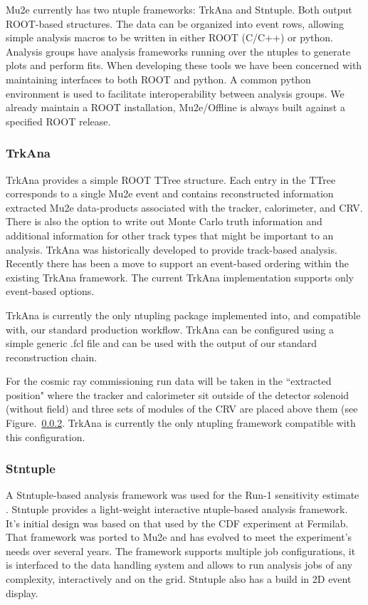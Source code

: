 
Mu2e currently has two ntuple frameworks: TrkAna and Stntuple. Both output ROOT-based structures. The data can be organized into event rows, allowing simple analysis macros to be written in either ROOT (C/C++) or python. Analysis groups have analysis frameworks running over the ntuples to generate plots and perform fits. When developing these tools we have been concerned with maintaining interfaces to both ROOT and python. A common python environment is used to facilitate interoperability between analysis groups. We already maintain a ROOT installation, Mu2e/Offline is always built against a specified ROOT release.



\subsubsection{TrkAna}

TrkAna provides a simple ROOT TTree structure. Each entry in the TTree corresponds to a single Mu2e event and contains reconstructed information extracted Mu2e data-products associated with the tracker, calorimeter, and CRV. There is also the option to write out Monte Carlo truth information and additional information for other track types that might be important to an analysis. TrkAna was historically developed to provide track-based analysis. Recently there has been a move to support an event-based ordering within the existing TrkAna framework. The current TrkAna implementation supports only event-based options.

TrkAna is currently the only ntupling package implemented into, and compatible with, our standard production workflow. TrkAna can be configured using a simple generic .fcl file and can be used with the output of our standard reconstruction chain.

For the cosmic ray commissioning run data will be taken in the ``extracted position" where the tracker and calorimeter sit outside of the detector solenoid (without field) and three sets of modules of the CRV are placed above them (see Figure.~\ref{}. TrkAna is currently the only ntupling framework compatible with this configuration.


\subsubsection{Stntuple}
A Stntuple-based analysis framework was used for the Run-1 sensitivity estimate \cite{Mu2e:2022ggl}. Stntuple provides a light-weight interactive ntuple-based analysis framework. It's initial design was based on that used by the CDF experiment at Fermilab. That framework was ported to Mu2e and has evolved to meet the experiment's needs over several years. The framework supports multiple job configurations, it is interfaced to the data handling system and allows to run analysis jobs of any complexity, interactively and on the grid. Stntuple also has a build in 2D event display.


